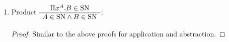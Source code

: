\begin{lemma}
\begin{enumerate}
    \begin{proof} By induction on $a \in \SN$ using the definition
      $p(a) := \forall A e. \rulev{a = \lambda x^A.e}{A \in \SN}$.
      $$
      \begin{array}{ll}
        \text{goal}: & p(a)
        \\
        \text{hypo}: & \forall b.\ruleh{a \reduce b}{p(b)}
      \end{array}
      $$

      Assume $a = \lambda x^A.e$ and $A \reduce B$ and prove the subgoal
      $B \in \SN$.
      $$
      \begin{array}{llll}
        A \reduce B
        & \imp & \lambda x^A.e \reduce \lambda x^B.e
        &\text{definition of }\reduce
        \\
        & \imp & a \reduce  \lambda x^B.e & \text{assumption}
        \\
        & \imp & p(\lambda x^B.e) & \text{hypo}
        \\
        & \imp & B \in \SN & \text{definition of }p(\lambda x^B.e)
      \end{array}
      $$
    \end{proof}

  \item Product
    $\begin{array}{c} \Pi x^A.B \in \text{SN} \\ \hline A \in \text{SN} \land B \in \text{SN}\end{array}$:
    \begin{proof}
      Similar to the above proofs for application and abstraction.
    \end{proof}

  \end{enumerate}
\end{lemma}
